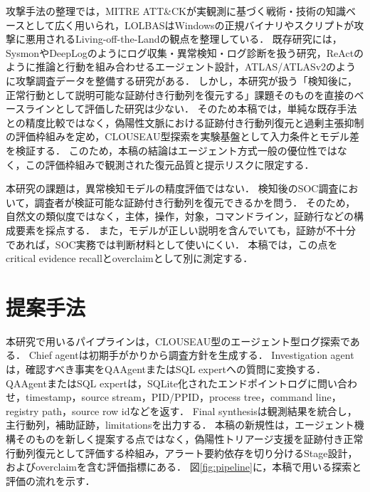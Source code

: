 \documentclass[a4paper,twocolumn,10pt]{article}
\begin{document}
攻撃手法の整理では，MITRE ATT\&CK\cite{attack}が実観測に基づく戦術・技術の知識ベースとして広く用いられ，LOLBAS\cite{lolbas}はWindowsの正規バイナリやスクリプトが攻撃に悪用されるLiving-off-the-Landの観点を整理している．
既存研究には，Sysmon\cite{sysmon}やDeepLog\cite{deeplog}のようにログ収集・異常検知・ログ診断を扱う研究，ReAct\cite{react}のように推論と行動を組み合わせるエージェント設計，ATLAS/ATLASv2\cite{atlas,atlasv2}のように攻撃調査データを整備する研究がある．
しかし，本研究が扱う「検知後に，正常行動として説明可能な証跡付き行動列を復元する」課題そのものを直接のベースラインとして評価した研究は少ない．
そのため本稿では，単純な既存手法との精度比較ではなく，偽陽性文脈における証跡付き行動列復元と過剰主張抑制の評価枠組みを定め，CLOUSEAU型探索を実験基盤として入力条件とモデル差を検証する．
このため，本稿の結論はエージェント方式一般の優位性ではなく，この評価枠組みで観測された復元品質と提示リスクに限定する．

本研究の課題は，異常検知モデルの精度評価ではない．
検知後のSOC調査において，調査者が検証可能な証跡付き行動列を復元できるかを問う．
そのため，自然文の類似度ではなく，主体，操作，対象，コマンドライン，証跡行などの構成要素を採点する．
また，モデルが正しい説明を含んでいても，証跡が不十分であれば，SOC実務では判断材料として使いにくい．
本稿では，この点をcritical evidence recallとoverclaimとして別に測定する．

\section{提案手法}

本研究で用いるパイプラインは，CLOUSEAU型のエージェント型ログ探索\cite{clouseau}である．
Chief agentは初期手がかりから調査方針を生成する．
Investigation agentは，確認すべき事実をQAAgentまたはSQL expertへの質問に変換する．
QAAgentまたはSQL expertは，SQLite化されたエンドポイントログに問い合わせ，timestamp，source stream，PID/PPID，process tree，command line，registry path，source row idなどを返す．
Final synthesisは観測結果を統合し，主行動列，補助証跡，limitationsを出力する．
本稿の新規性は，エージェント機構そのものを新しく提案する点ではなく，偽陽性トリアージ支援を証跡付き正常行動列復元として評価する枠組み，アラート要約依存を切り分けるStage設計，およびoverclaimを含む評価指標にある．
図\ref{fig:pipeline}に，本稿で用いる探索と評価の流れを示す．
\end{document}
